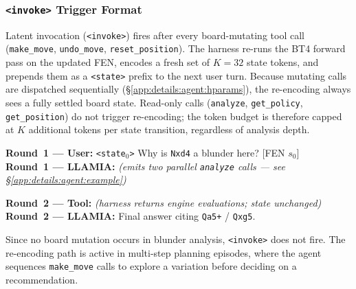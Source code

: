 \subsubsection{\texttt{<invoke>} Trigger Format}
\label{app:details:prompts:invoke}

Latent invocation (\texttt{<invoke>}) fires after every board-mutating tool
call (\texttt{make\_move}, \texttt{undo\_move}, \texttt{reset\_position}).
The harness re-runs the BT4 forward pass on the updated FEN, encodes a fresh
set of $K{=}32$ state tokens, and prepends them as a \texttt{<state>} prefix to
the next user turn.
Because mutating calls are dispatched sequentially (\S\ref{app:details:agent:hparams}),
the re-encoding always sees a fully settled board state.
Read-only calls (\texttt{analyze}, \texttt{get\_policy}, \texttt{get\_position})
do not trigger re-encoding; the token budget is therefore capped at $K$ additional
tokens per state transition, regardless of analysis depth.

\begin{tcolorbox}[notebox, title={\texttt{<invoke>} Turn Structure (blunder-analysis episode)}]
\small
\textbf{Round~1 --- User:} \texttt{<state$_0$>} Why is \texttt{Nxd4} a blunder here?
[FEN $s_0$]\\[3pt]
\textbf{Round~1 --- LLAMIA:} \textit{(emits two parallel \texttt{analyze} calls ---
see \S\ref{app:details:agent:example})}

\tcbline
\textbf{Round~2 --- Tool:} \textit{(harness returns engine evaluations; state unchanged)}\\[3pt]
\textbf{Round~2 --- LLAMIA:} Final answer citing \texttt{Qa5+} / \texttt{Qxg5}.
\end{tcolorbox}

Since no board mutation occurs in blunder analysis, \texttt{<invoke>} does not fire.
The re-encoding path is active in multi-step planning episodes, where the agent
sequences \texttt{make\_move} calls to explore a variation before deciding on a
recommendation.

